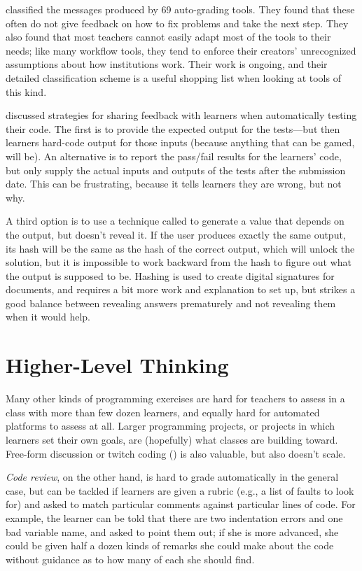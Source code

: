 \cite{Keun2016a,Keun2016b} classified the messages produced by 69
auto-grading tools.  They found that these often do not give feedback
on how to fix problems and take the next step.  They also found that
most teachers cannot easily adapt most of the tools to their needs;
like many workflow tools, they tend to enforce their creators'
unrecognized assumptions about how institutions work.  Their work is
ongoing, and their detailed classification scheme is a useful shopping
list when looking at tools of this kind.

\cite{Srid2016} discussed strategies for sharing feedback with
learners when automatically testing their code.  The first is to
provide the expected output for the tests---but then learners
hard-code output for those inputs (because anything that can be gamed,
will be).  An alternative is to report the pass/fail results for the
learners' code, but only supply the actual inputs and outputs of the
tests after the submission date.  This can be frustrating, because
it tells learners they are wrong, but not why.

A third option is to use a technique called
 to generate a value that depends on the
output, but doesn't reveal it.  If the user produces exactly the same
output, its hash will be the same as the hash of the correct output,
which will unlock the solution, but it is impossible to work backward
from the hash to figure out what the output is supposed to be.
Hashing is used to create digital signatures for documents, and
requires a bit more work and explanation to set up, but strikes a good
balance between revealing answers prematurely and not revealing them
when it would help.

\section{Higher-Level Thinking}\label{s:exercises-higher}

Many other kinds of programming exercises are hard for teachers to
assess in a class with more than few dozen learners, and equally hard
for automated platforms to assess at all.  Larger programming
projects, or projects in which learners set their own goals, are
(hopefully) what classes are building toward.  Free-form discussion or
twitch coding () is also valuable, but also
doesn't scale.

\emph{Code review}, on the other hand, is hard to grade automatically
in the general case, but can be tackled if learners are given a rubric
(e.g., a list of faults to look for) and asked to match particular
comments against particular lines of code. For example, the learner
can be told that there are two indentation errors and one bad variable
name, and asked to point them out; if she is more advanced, she could
be given half a dozen kinds of remarks she could make about the code
without guidance as to how many of each she should find.

